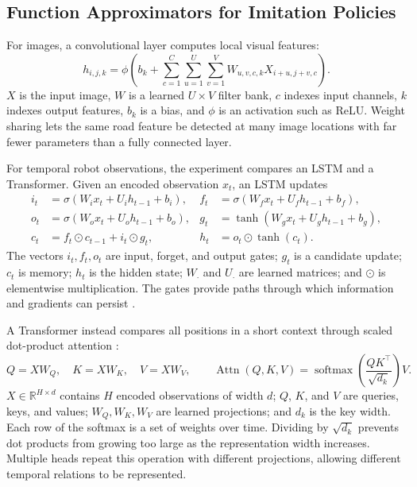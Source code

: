 \documentclass[10pt]{article}
\begin{document}
\subsection{Function Approximators for Imitation Policies}

For images, a convolutional layer computes local visual features:
\begin{equation}
  h_{i,j,k}
  =\phi\!\left(
  b_k+\sum_{c=1}^{C}\sum_{u=1}^{U}\sum_{v=1}^{V}
  W_{u,v,c,k}X_{i+u,j+v,c}\right).
  \label{eq:conv}
\end{equation}
$X$ is the input image, $W$ is a learned $U\times V$ filter bank, $c$ indexes
input channels, $k$ indexes output features, $b_k$ is a bias, and $\phi$ is an
activation such as ReLU. Weight sharing lets the same road feature be detected
at many image locations with far fewer parameters than a fully connected layer.

For temporal robot observations, the experiment compares an LSTM and a
Transformer. Given an encoded observation $x_t$, an LSTM updates
\begin{align}
  i_t&=\sigma(W_ix_t+U_ih_{t-1}+b_i),&
  f_t&=\sigma(W_fx_t+U_fh_{t-1}+b_f),\nonumber\\
  o_t&=\sigma(W_ox_t+U_oh_{t-1}+b_o),&
  g_t&=\tanh(W_gx_t+U_gh_{t-1}+b_g),\nonumber\\
  c_t&=f_t\odot c_{t-1}+i_t\odot g_t,&
  h_t&=o_t\odot\tanh(c_t).
  \label{eq:lstm}
\end{align}
The vectors $i_t,f_t,o_t$ are input, forget, and output gates; $g_t$ is a
candidate update; $c_t$ is memory; $h_t$ is the hidden state; $W_\cdot$ and
$U_\cdot$ are learned matrices; and $\odot$ is elementwise multiplication. The
gates provide paths through which information and gradients can persist
\citep{hochreiter1997lstm}.

A Transformer instead compares all positions in a short context through scaled
dot-product attention \citep{vaswani2017attention}:
\begin{equation}
  Q=XW_Q,\quad K=XW_K,\quad V=XW_V,\qquad
  \operatorname{Attn}(Q,K,V)
  =\operatorname{softmax}\!\left(\frac{QK^\top}{\sqrt{d_k}}\right)V.
  \label{eq:attention}
\end{equation}
$X\in\mathbb{R}^{H\times d}$ contains $H$ encoded observations of width $d$;
$Q$, $K$, and $V$ are queries, keys, and values; $W_Q,W_K,W_V$ are learned
projections; and $d_k$ is the key width. Each row of the softmax is a set of
weights over time. Dividing by $\sqrt{d_k}$ prevents dot products from growing
too large as the representation width increases. Multiple heads repeat this
operation with different projections, allowing different temporal relations to
be represented.
\end{document}
